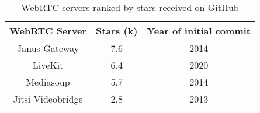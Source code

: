 \begin{table}[ht]
\centering
\caption{WebRTC servers ranked by stars received on GitHub}
\label{tab:githubStarsRankingWebRTC}
\begin{tabular}[t]{|c|c|c|}
\toprule
WebRTC Server & Stars (k) & Year of initial commit\\
\midrule
Janus Gateway & 7.6 & 2014\\
LiveKit & 6.4 & 2020\\
Mediasoup & 5.7 & 2014\\
Jitsi Videobridge & 2.8 & 2013\\
\bottomrule
\end{tabular}
\end{table}
